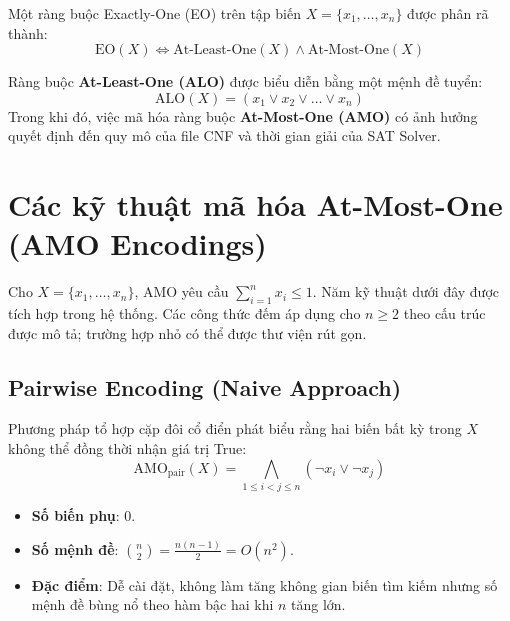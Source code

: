 \documentclass[a4paper,fleqn,nologo]{cas-sc}
\begin{document}
Một ràng buộc Exactly-One (EO) trên tập biến $X = \{x_1, \dots, x_n\}$ được phân rã thành:
\begin{equation}
\text{EO}(X) \iff \text{At-Least-One}(X) \land \text{At-Most-One}(X)
\end{equation}

Ràng buộc \textbf{At-Least-One (ALO)} được biểu diễn bằng một mệnh đề tuyển:
\begin{equation}
\text{ALO}(X) = (x_1 \lor x_2 \lor \dots \lor x_n)
\end{equation}
Trong khi đó, việc mã hóa ràng buộc \textbf{At-Most-One (AMO)} có ảnh hưởng quyết định đến quy mô của file CNF và thời gian giải của SAT Solver.

\section{Các kỹ thuật mã hóa At-Most-One (AMO Encodings)}

Cho $X=\{x_1,\dots,x_n\}$, AMO yêu cầu $\sum_{i=1}^n x_i\le1$. Năm kỹ thuật dưới đây được tích hợp trong hệ thống. Các công thức đếm áp dụng cho $n\ge2$ theo cấu trúc được mô tả; trường hợp nhỏ có thể được thư viện rút gọn.

\subsection{Pairwise Encoding (Naive Approach)}
Phương pháp tổ hợp cặp đôi cổ điển phát biểu rằng hai biến bất kỳ trong $X$ không thể đồng thời nhận giá trị True:
\begin{equation}
\text{AMO}_{\text{pair}}(X) = \bigwedge_{1 \le i < j \le n} (\neg x_i \lor \neg x_j)
\end{equation}
\begin{itemize}
    \item \textbf{Số biến phụ}: $0$.
    \item \textbf{Số mệnh đề}: $\binom{n}{2} = \frac{n(n-1)}{2} = O(n^2)$.
    \item \textbf{Đặc điểm}: Dễ cài đặt, không làm tăng không gian biến tìm kiếm nhưng số mệnh đề bùng nổ theo hàm bậc hai khi $n$ tăng lớn.
\end{itemize}
\end{document}
